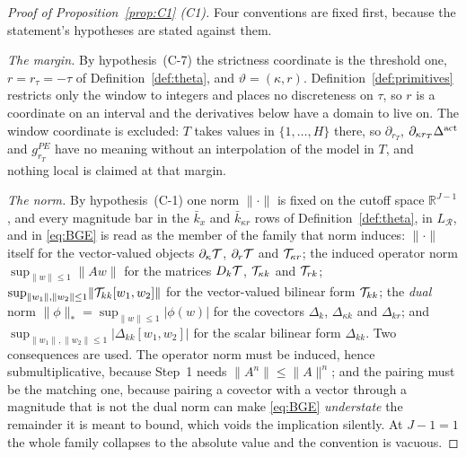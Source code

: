 \begin{proof}[Proof of Proposition~\ref{prop:C1} (C1)]
Four conventions are fixed first, because the statement's hypotheses are stated against them.

\emph{The margin.} By hypothesis~(C-7) the strictness coordinate is the threshold one,
$r = r_\tau = -\tau$ of Definition~\ref{def:theta}, and $\vartheta = (\kappa,r)$.
Definition~\ref{def:primitives} restricts only the window to integers and places no discreteness on
$\tau$, so $r$ is a coordinate on an interval and the derivatives below have a domain to live on.
The window coordinate is excluded: $T$ takes values in $\{1,\dots,H\}$ there, so $\partial_{r_T}$,
$\partial_{\kappa r_T}\Delta^{\mathrm{act}}$ and $g_{r_T}^{PE}$ have no meaning without an interpolation of the
model in $T$, and nothing local is claimed at that margin.

\emph{The norm.} By hypothesis~(C-1) one norm $\lVert\cdot\rVert$ is fixed on the cutoff space
$\mathbb R^{J-1}$, and every magnitude bar in the $\bar k_x$ and $\bar k_{\kappa r}$ rows of
Definition~\ref{def:theta}, in $L_{\mathcal R}$, and in \eqref{eq:BGE} is read as the member of the
family that norm induces: $\lVert\cdot\rVert$ itself for the vector-valued objects
$\partial_\kappa\mathcal{T}$, $\partial_r\mathcal{T}$ and $\mathcal{T}_{\kappa r}$; the induced operator norm
$\sup_{\lVert w\rVert\le1}\lVert Aw\rVert$ for the matrices $D_k\mathcal{T}$, $\mathcal{T}_{\kappa k}$ and
$\mathcal{T}_{rk}$; $\sup_{\lVert w_1\rVert,\lVert w_2\rVert\le1}\lVert\mathcal{T}_{kk}[w_1,w_2]\rVert$ for the
vector-valued bilinear form $\mathcal{T}_{kk}$; the \emph{dual} norm
$\lVert\phi\rVert_* = \sup_{\lVert w\rVert\le1}\lvert\phi(w)\rvert$ for the covectors $\Delta_k$,
$\Delta_{\kappa k}$ and $\Delta_{kr}$; and
$\sup_{\lVert w_1\rVert,\lVert w_2\rVert\le1}\lvert\Delta_{kk}[w_1,w_2]\rvert$ for the scalar
bilinear form $\Delta_{kk}$. Two consequences are used. The operator norm must be induced, hence
submultiplicative, because Step~1 needs $\lVert A^n\rVert \le \lVert A\rVert^n$; and the pairing
must be the matching one, because pairing a covector with a vector through a magnitude that is not
the dual norm can make \eqref{eq:BGE} \emph{understate} the remainder it is meant to bound, which
voids the implication silently. At $J-1 = 1$ the whole family collapses to the absolute value and
the convention is vacuous.


\end{proof}
